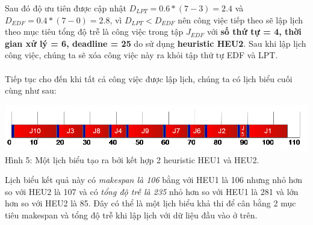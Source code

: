 \documentclass[a4paper,12pt]{article}
\begin{document}
Sau đó độ ưu tiên được cập nhật $D_{LPT} = 0.6*(7 - 3) = 2.4$ và $D_{EDF} = 0.4*(7 - 0) = 2.8$, vì $D_{LPT} < D_{EDF}$ nên công việc tiếp theo sẽ lập lịch theo mục tiêu tổng độ trễ là công việc trong tập $J_{EDF}$ với \textbf{số thứ tự = 4, thời gian xử lý = 6, deadline = 25} do sử dụng \textbf{heuristic HEU2}. Sau khi lập lịch công việc, chúng ta sẽ xóa công việc này ra khỏi tập thứ tự EDF và LPT.\\\\
Tiếp tục cho đến khi tất cả công việc được lập lịch, chúng ta có lịch biểu cuối cùng như sau:
\begin{center}
\includegraphics[scale=0.7]{Fig_5.png}
\\
Hình 5: Một lịch biểu tạo ra bởi kết hợp 2 heuristic HEU1 và HEU2.
\end{center}
Lịch biểu kết quả này có \textit{makespan là 106} bằng với HEU1 là 106 nhưng nhỏ hơn so với HEU2 là 107 và có \textit{tổng độ trễ là 235} nhỏ hơn so với HEU1 là 281 và lớn hơn so với HEU2 là 85. Đây có thể là một lịch biểu khả thi để cân bằng 2 mục tiêu makespan và tổng độ trễ khi lập lịch với dữ liệu đầu vào ở trên.
\end{document}
